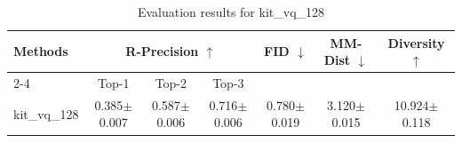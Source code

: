 \begin{table}[h]
\centering
\begin{tabular}{l ccc ccc}
\toprule
\multirow{2}{*}{\textbf{Methods}} & \multicolumn{3}{c}{\textbf{R-Precision $\uparrow$}} & \multirow{2}{*}{\textbf{FID $\downarrow$}} & \multirow{2}{*}{\textbf{MM-Dist $\downarrow$}} & \multirow{2}{*}{\textbf{Diversity $\uparrow$}} \\
\cmidrule(lr){2-4}
& Top-1 & Top-2 & Top-3 & & & \\
\midrule
kit_vq_128 & 0.385$\pm$0.007 & 0.587$\pm$0.006 & 0.716$\pm$0.006 & 0.780$\pm$0.019 & 3.120$\pm$0.015 & 10.924$\pm$0.118 \\
\bottomrule
\end{tabular}
\caption{Evaluation results for kit_vq_128}
\label{tab:results_kit_vq_128}
\end{table}
